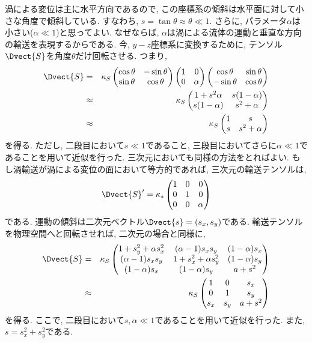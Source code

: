 渦による変位は主に水平方向であるので, この座標系の傾斜は水平面に対して小さな角度で傾斜している. 
すなわち, $s = \tan \theta \approx \theta \ll 1$. 
さらに, パラメータ$\alpha$は小さい($\alpha \ll 1$)と思ってよい. 
なぜならば, $\alpha$は渦による流体の運動と垂直な方向の輸送を表現するからである. 
今, $y-z$座標系に変換するために, テンソル$\Dvect{S}$を角度$\theta$だけ回転させる. 
つまり, 
\begin{eqnarray}
  \Dvect{S} &=& \kappa_S
\begin{pmatrix}
  \cos\theta &-\sin\theta \\
  \sin\theta &\cos\theta
\end{pmatrix}
\begin{pmatrix}
  1 &0 \\
  0 &\alpha
\end{pmatrix}
\begin{pmatrix}
  \cos\theta &\sin\theta \\
  -\sin\theta &\cos\theta
\end{pmatrix}
\\
 &\approx& \kappa_S
\begin{pmatrix}
 1+s^2 \alpha &s(1-\alpha) \\
 s(1-\alpha)  &s^2 + \alpha
\end{pmatrix} 
\\
 &\approx& \kappa_S
\begin{pmatrix}
  1 &s \\
  s &s^2+\alpha
\end{pmatrix}
\label{eq:EddDiffSymTensor2D}
\end{eqnarray}%
%
を得る. 
ただし, 二段目において$s \ll 1$であること, 
三段目においてさらに$\alpha \ll 1$であることを用いて近似を行った. 
三次元においても同様の方法をとればよい. 
もし渦輸送が渦による変位の面において等方的であれば, 三次元の輸送テンソルは, 
\begin{equation}
  \Dvect{S}' = \kappa_s
\begin{pmatrix}
    1 &0 &0 \\
    0 &1 &0 \\
    0 &0 &\alpha 
  \end{pmatrix}
\end{equation}
である. 
運動の傾斜は二次元ベクトル$\Dvect{s} = (s_x,s_y)$である. 
輸送テンソルを物理空間へと回転させれば, 二次元の場合と同様に, 
\begin{eqnarray}
\Dvect{S} &=& \kappa_S 
\begin{pmatrix}
  1+s_y^2 + \alpha s_x^2 &(\alpha-1) s_x s_y   &(1-\alpha)s_x \\
  (\alpha-1) s_x s_y     &1+s_x^2+\alpha s_y^2 &(1-\alpha)s_y \\
  (1-\alpha)s_x          &(1-\alpha)s_y        &a + s^2
\end{pmatrix} 
\\
 &\approx& \kappa_S
\begin{pmatrix}
  1     &0       &s_x \\
  0     &1       &s_y \\
  s_x   &s_y     &a + s^2
\end{pmatrix} 
\end{eqnarray}
を得る. 
ここで, 二段目において$s,\alpha \ll 1$であることを用いて近似を行った. 
また, $s=s_x^2 + s_y^2$である. 

